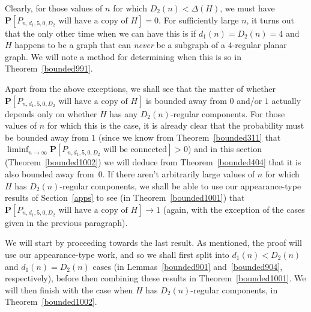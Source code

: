 \documentclass{article}
\newtheorem{Proof of Theorem}{Proof of Theorem}
\begin{document}
Clearly, for those values of $n$ for which $D_{2}(n) < \Delta(H)$,
we must have $\mathbf{P}[P_{n,d_{1},5,0,D_{2}} \textrm{ will have a copy of } H] =0$.
For sufficiently large $n$,
it turns out that the only other time when we can have this
is if $d_{1}(n)=D_{2}(n)=4$ 
and $H$ happens to be a graph that can \textit{never} be a subgraph of a $4$-regular planar graph.
We will note a method for determining when this is so in Theorem~\ref{bounded991}.

Apart from the above exceptions,
we shall see that the matter of whether
$\mathbf{P}[P_{n,d_{1},5,0,D_{2}} \textrm{ will have a copy of } H]$
is bounded away from $0$ and/or $1$
actually depends only on whether $H$ has any $D_{2}(n)$-regular components.
For those values of $n$ for which this is the case,
it is already clear that the probability must be bounded away from $1$
(since we know from Theorem~\ref{bounded311} that
$\liminf_{n \to \infty} \mathbf{P}[P_{n,d_{1},5,0,D_{2}} \textrm{ will be connected}] >0$)
and in this section (Theorem~\ref{bounded1002})
we will deduce from Theorem~\ref{bounded404} that it is also bounded away from~$0$.
If there aren't arbitrarily large values of $n$ for which $H$ has $D_{2}(n)$-regular components,
we shall be able to use our appearance-type results of Section~\ref{apps} 
to see (in Theorem~\ref{bounded1001}) that 
$\mathbf{P}[P_{n,d_{1},5,0,D_{2}} \textrm{ will have a copy of } H] \to 1$
(again, with the exception of the cases given in the previous paragraph).

We will start by proceeding towards the
last result.
As mentioned,
the proof will use our appearance-type work,
and so we shall first split into $d_{1}(n) < D_{2}(n)$ and $d_{1}(n)=D_{2}(n)$ cases
(in Lemmas~\ref{bounded901} and~\ref{bounded904}, respectively),
before then combining these results in Theorem~\ref{bounded1001}.
We will then finish with the case when $H$ has $D_{2}(n)$-regular components,
in Theorem~\ref{bounded1002}. 
\end{document}
